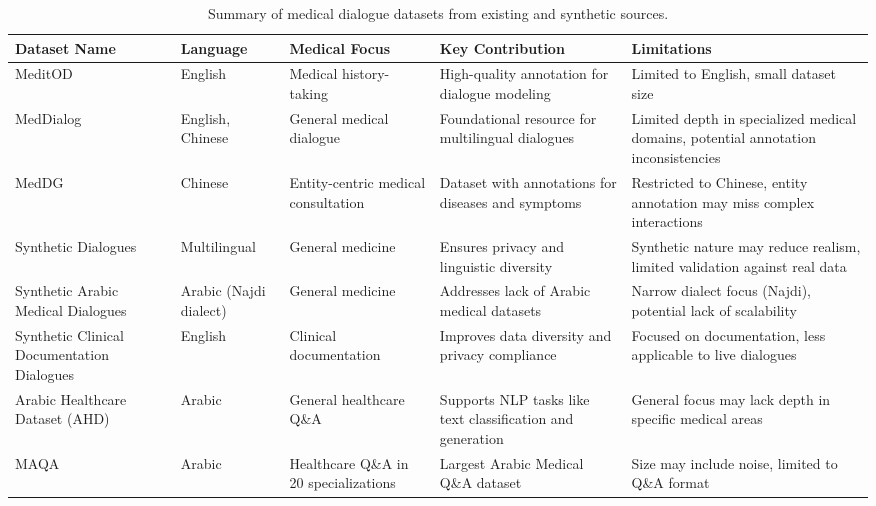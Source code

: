\documentclass[manuscript,screen,review]{acmart}
\begin{document}
\begin{table}[ht]
\centering
\caption{Summary of medical dialogue datasets from existing and synthetic sources.}
\label{tab:dialogue_datasets}
\small 
\begin{tabular}{|p{3cm}|p{2.5cm}|p{2.8cm}|p{3.2cm}|p{3.5cm}|}
\hline
\textbf{Dataset Name} & \textbf{Language} & \textbf{Medical Focus} & \textbf{Key Contribution} & \textbf{Limitations} \\ \hline
MeditOD \cite{saley-etal-2024-meditod} & English & Medical history-taking & High-quality annotation for dialogue modeling & Limited to English, small dataset size \\ \hline
MedDialog \cite{zeng-etal-2020-meddialog} & English, Chinese & General medical dialogue & Foundational resource for multilingual dialogues & Limited depth in specialized medical domains, potential annotation inconsistencies \\ \hline
MedDG \cite{liu2022meddgentitycentricmedicalconsultation} & Chinese & Entity-centric medical consultation & Dataset with annotations for diseases and symptoms & Restricted to Chinese, entity annotation may miss complex interactions \\ \hline
Synthetic Dialogues \cite{das2024syntheticpatientphysiciandialoguegeneration} & Multilingual & General medicine & Ensures privacy and linguistic diversity & Synthetic nature may reduce realism, limited validation against real data \\ \hline
Synthetic Arabic Medical Dialogues \cite{almutairi-etal-2024-synthetic} & Arabic (Najdi dialect) & General medicine & Addresses lack of Arabic medical datasets & Narrow dialect focus (Najdi), potential lack of scalability \\ \hline
Synthetic Clinical Documentation Dialogues \cite{wang2023umassbionlpmediqachat2023llms} & English & Clinical documentation & Improves data diversity and privacy compliance & Focused on documentation, less applicable to live dialogues \\ \hline
Arabic Healthcare Dataset (AHD) \cite{al2024ahd} & Arabic & General healthcare Q\&A & Supports NLP tasks like text classification and generation & General focus may lack depth in specific medical areas \\ \hline
MAQA \cite{Abdelhay2023Deep} & Arabic & Healthcare Q\&A in 20 specializations & Largest Arabic Medical Q\&A dataset & Size may include noise, limited to Q\&A format \\ \hline
\end{tabular}
\end{table}
\FloatBarrier
\end{document}
